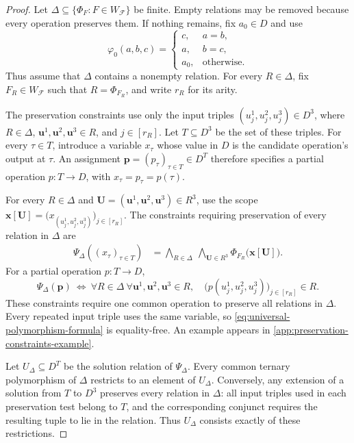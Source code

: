 \documentclass[11pt,letterpaper,onecolumn]{article}
\theoremstyle{plain}
\theoremstyle{definition}
\theoremstyle{remark}
\newcommand{\cF}{\mathcal F}
\newcommand{\SuppRel}[1]{\Phi_{#1}}
\begin{document}
\begin{proof}
Let $\Delta\subseteq\{\SuppRel F:F\in W_{\cF}\}$ be finite.  Empty
relations may be removed because every operation preserves them.  If nothing
remains, fix $a_0\in D$ and use
\[
  \varphi_0(a,b,c)=
  \begin{cases}
    c,&a=b,\\
    a,&b=c,\\
    a_0,&\text{otherwise}.
  \end{cases}
\]
Thus assume that $\Delta$ contains a nonempty relation.  For every
$R\in\Delta$, fix $F_R\in W_{\cF}$ such that $R=\SuppRel{F_R}$, and write
$r_R$ for its arity.

The preservation constraints use only the input triples
$(u^1_j,u^2_j,u^3_j)\in D^3$, where $R\in\Delta$,
$\mathbf u^1,\mathbf u^2,\mathbf u^3\in R$, and $j\in[r_R]$.
Let $T\subseteq D^3$ be the set of these triples.  For every $\tau\in T$,
introduce a variable $x_\tau$ whose value in $D$ is the candidate
operation's output at $\tau$.  An assignment
$\mathbf p=(p_\tau)_{\tau\in T}\in D^T$ therefore specifies a partial
operation $p:T\to D$, with $x_\tau=p_\tau=p(\tau)$.

For every $R\in\Delta$ and
$\mathbf U=(\mathbf u^1,\mathbf u^2,\mathbf u^3)\in R^3$, use the
scope $\mathbf x[\mathbf U] =\bigl(x_{(u^1_j,u^2_j,u^3_j)}\bigr)_{j\in[r_R]}$.
The constraints requiring preservation of every relation in $\Delta$ are
\begin{align}
  \Psi_\Delta((x_\tau)_{\tau\in T})
  &=\bigwedge_{R\in\Delta}
    \ \bigwedge_{\mathbf U\in R^3}
    \SuppRel{F_R}\bigl(\mathbf x[\mathbf U]\bigr).
  \label{eq:universal-polymorphism-formula}
\end{align}
For a partial operation $p:T\to D$,
\begin{equation*}
  \Psi_\Delta(\mathbf p)\ \Longleftrightarrow\ 
  \forall R\in\Delta\ \forall\mathbf u^1,\mathbf u^2,\mathbf u^3\in R,
  \quad\bigl(p(u^1_j,u^2_j,u^3_j)\bigr)_{j\in[r_R]}\in R.
\end{equation*}
These constraints require one common operation to preserve all relations
in $\Delta$.  Every repeated input triple uses the same variable, so
\eqref{eq:universal-polymorphism-formula} is equality-free.
An example appears in \cref{app:preservation-constraints-example}.

Let $U_\Delta\subseteq D^T$ be the solution relation of $\Psi_\Delta$.
Every common ternary polymorphism of $\Delta$ restricts to an element
of $U_\Delta$.  Conversely, any extension of a solution from $T$ to
$D^3$ preserves every relation in $\Delta$: all input triples used in
each preservation test belong to $T$, and the corresponding conjunct
requires the resulting tuple to lie in the relation.
Thus $U_\Delta$ consists exactly of these restrictions.


\end{proof}
\end{document}
